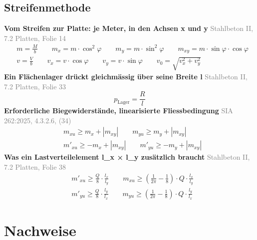 \documentclass[11pt,a4paper]{article}
\newcommand{\normref}[1]{{\small\textcolor{gray}{#1}}}
\begin{document}
\subsection{Streifenmethode}
\noindent\textbf{Vom Streifen zur Platte: je Meter, in den Achsen x und y} \hfill \normref{Stahlbeton II, 7.2 Platten, Folie 14}
\begin{equation*}
\begin{aligned} & m = \frac{M}{b} \qquad m_x = m \cdot \cos^2\varphi \qquad m_y = m \cdot \sin^2\varphi \qquad m_{xy} = m \cdot \sin\varphi \cdot \cos\varphi \\ & v = \frac{V}{b} \qquad v_x = v \cdot \cos\varphi \qquad v_y = v \cdot \sin\varphi \qquad v_0 = \sqrt{v_x^2 + v_y^2} \end{aligned}
\end{equation*}
\noindent\textbf{Ein Flächenlager drückt gleichmässig über seine Breite l} \hfill \normref{Stahlbeton II, 7.2 Platten, Folie 33}
\begin{equation*}
p_{\mathrm{Lager}} = \frac{R}{l}
\end{equation*}
\noindent\textbf{Erforderliche Biegewiderstände, linearisierte Fliessbedingung} \hfill \normref{SIA 262:2025, 4.3.2.6, (34)}
\begin{equation*}
\begin{aligned} & m_{xu} \ge m_x + |m_{xy}| \qquad m_{yu} \ge m_y + |m_{xy}| \\ & m'_{xu} \ge -m_x + |m_{xy}| \qquad m'_{yu} \ge -m_y + |m_{xy}| \end{aligned}
\end{equation*}
\noindent\textbf{Was ein Lastverteilelement l\_x × l\_y zusätzlich braucht} \hfill \normref{Stahlbeton II, 7.2 Platten, Folie 38}
\begin{equation*}
\begin{aligned} & m'_{xu} \ge \frac{Q}{8} \cdot \frac{l_x}{l_y} \qquad m_{xu} \ge \left(\frac{1}{2\pi} - \frac{1}{8}\right) \cdot Q \cdot \frac{l_x}{l_y} \\ & m'_{yu} \ge \frac{Q}{8} \cdot \frac{l_y}{l_x} \qquad m_{yu} \ge \left(\frac{1}{2\pi} - \frac{1}{8}\right) \cdot Q \cdot \frac{l_y}{l_x} \end{aligned}
\end{equation*}
\section{Nachweise}
\end{document}
